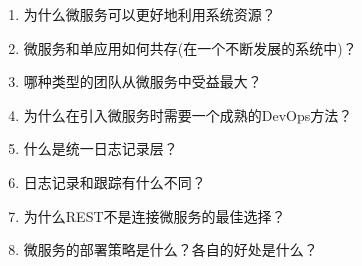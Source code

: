 \begin{enumerate}
\item
为什么微服务可以更好地利用系统资源？

\item
微服务和单应用如何共存(在一个不断发展的系统中)？

\item
哪种类型的团队从微服务中受益最大？

\item
为什么在引入微服务时需要一个成熟的DevOps方法？

\item
什么是统一日志记录层？

\item
日志记录和跟踪有什么不同？

\item
为什么REST不是连接微服务的最佳选择？

\item
微服务的部署策略是什么？各自的好处是什么？
\end{enumerate}